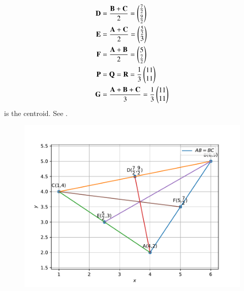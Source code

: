 \begin{align}
\mathbf{D}&=\frac{\mathbf{B}+\mathbf{C}}{2}
=\begin{pmatrix}\frac{7}{2}\\[2pt] \frac{9}{2}\end{pmatrix}\\
\mathbf{E}&=\frac{\mathbf{A}+\mathbf{C}}{2}
=\begin{pmatrix}\frac{5}{2}\\ 3\end{pmatrix}\\
\mathbf{F}&=\frac{\mathbf{A}+\mathbf{B}}{2}
=\begin{pmatrix}5\\ \frac{7}{2}\end{pmatrix}
\\
\mathbf{P}
	&=\mathbf{Q}
=\mathbf{R}
=\frac{1}{3}\begin{pmatrix}11\\11\end{pmatrix}
\\
\mathbf{G}&=\frac{\mathbf{A}+\mathbf{B}+\mathbf{C}}{3}
=\frac{1}{3}\begin{pmatrix}11\\11\end{pmatrix}
\end{align} 
is the centroid.
See 
  .
\begin{figure}[h!]
\centering
\includegraphics[width=\columnwidth]{chapters/10/7/4/7/figs/dj.pdf}
\caption{}
  \label{fig:chapters/10/7/4/7/Figure}
\end{figure}

